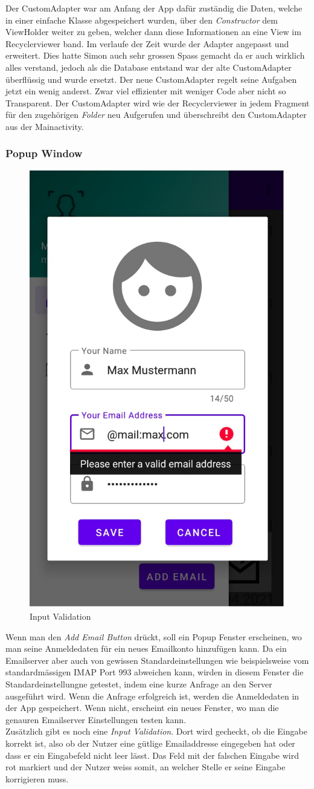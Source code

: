 \documentclass[a4paper,11pt]{article}
\begin{document}
Der CustomAdapter war am Anfang der App dafür zuständig die Daten, welche in einer einfache Klasse abgespeichert wurden, über den 
\textit{Constructor} dem ViewHolder weiter zu geben, welcher dann diese Informationen an eine View im Recyclerviewer band. Im verlaufe der Zeit wurde 
der Adapter angepasst und erweitert. Dies hatte Simon auch sehr grossen Spass gemacht da er auch wirklich alles verstand, jedoch als die Database entstand war der alte 
CustomAdapter überflüssig und wurde ersetzt. Der neue CustomAdapter regelt seine Aufgaben jetzt ein wenig anderst. Zwar viel effizienter mit weniger Code aber nicht 
so Transparent. Der CustomAdapter wird wie der Recyclerviewer in jedem Fragment für den zugehörigen \textit{Folder} neu Aufgerufen und überschreibt den CustomAdapter 
aus der Mainactivity. 

\subsubsection{Popup Window}
\begin{figure}
\centering
\includegraphics[width=.18\textwidth]{media/inputValidation.png}
\caption{Input Validation}
\end{figure}
Wenn man den \textit{Add Email Button} drückt, soll ein Popup Fenster erscheinen, wo man seine Anmeldedaten für ein neues Emailkonto hinzufügen kann. Da ein Emailserver aber auch von gewissen Standardeinstellungen wie beispielsweise vom standardmässigen IMAP Port 993 abweichen kann, wirden in diesem Fenster die Standardeinstellungne getestet, indem eine kurze Anfrage an den Server ausgeführt wird. Wenn die Anfrage erfolgreich ist, werden die Anmeldedaten in der App gespeichert. Wenn nicht, erscheint ein neues Fenster, wo man die genauren Emailserver Einstellungen testen kann.\\

Zusätzlich gibt es noch eine \textit{Input Validation}. Dort wird gecheckt, ob die Eingabe korrekt ist, also ob der Nutzer eine gütlige Emailaddresse eingegeben hat oder dass er ein Eingabefeld nicht leer lässt. Das Feld mit der falschen Eingabe wird rot markiert und der Nutzer weiss somit, an welcher Stelle er seine Eingabe korrigieren muss.
\end{document}
